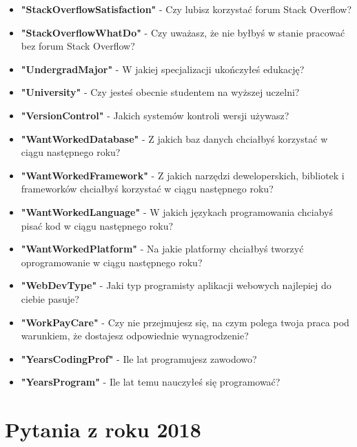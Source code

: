 \begin{appendices}
\begin{itemize}
        \item \textbf{"StackOverflowSatisfaction"} - Czy lubisz korzystać forum Stack Overflow?
        \item \textbf{"StackOverflowWhatDo"} - Czy uważasz, że nie byłbyś w stanie pracować bez forum Stack Overflow?
        \item \textbf{"UndergradMajor"} - W jakiej specjalizacji ukończyłeś edukację?
        \item \textbf{"University"} - Czy jesteś obecnie studentem na wyższej uczelni?
        \item \textbf{"VersionControl"} - Jakich systemów kontroli wersji używasz?
        \item \textbf{"WantWorkedDatabase"} - Z jakich baz danych chciałbyś korzystać w ciągu następnego roku?
        \item \textbf{"WantWorkedFramework"} - Z jakich narzędzi deweloperskich, bibliotek i frameworków chciałbyś korzystać w ciągu następnego roku?
        \item \textbf{"WantWorkedLanguage"} - W jakich językach programowania chciabyś pisać kod w ciągu następnego roku?
        \item \textbf{"WantWorkedPlatform"} - Na jakie platformy chciałbyś tworzyć oprogramowanie w ciągu następnego roku?
        \item \textbf{"WebDevType"} - Jaki typ programisty aplikacji webowych najlepiej do ciebie pasuje?
        \item \textbf{"WorkPayCare"} - Czy nie przejmujesz się, na czym polega twoja praca pod warunkiem, że dostajesz odpowiednie wynagrodzenie?
        \item \textbf{"YearsCodingProf"} - Ile lat programujesz zawodowo?
        \item \textbf{"YearsProgram"} - Ile lat temu nauczyłeś się programować?
    \end{itemize}


    \section{Pytania z roku 2018}\label{pytania-2018}



\end{appendices}
